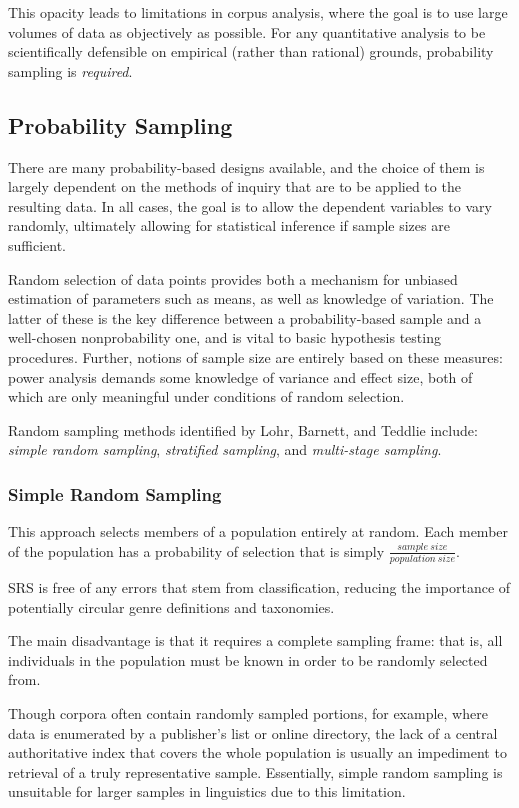 This opacity leads to limitations in corpus analysis, where the goal is to use large volumes of data as objectively as possible.  For any quantitative analysis to be scientifically defensible on empirical (rather than rational) grounds, probability sampling is \textsl{required}.




\subsection{Probability Sampling}
There are many probability-based designs available, and the choice of them is largely dependent on the methods of inquiry that are to be applied to the resulting data.  In all cases, the goal is to allow the dependent variables to vary randomly, ultimately allowing for statistical inference if sample sizes are sufficient.

Random selection of data points provides both a mechanism for unbiased estimation of parameters such as means, as well as knowledge of variation.  The latter of these is the key difference between a probability-based sample and a well-chosen nonprobability one, and is vital to basic hypothesis testing procedures.  Further, notions of sample size are entirely based on these measures: power analysis demands some knowledge of variance and effect size, both of which are only meaningful under conditions of random selection.

Random sampling methods identified by Lohr, Barnett, and Teddlie include\cite{lohr2009sampling,barnett1991sample,Teddlie01012007}: \textsl{simple random sampling}, \textsl{stratified sampling}, and \textsl{multi-stage sampling}.

\subsubsection{Simple Random Sampling}
This approach selects members of a population entirely at random.  Each member of the population has a probability of selection that is simply $\frac{sample~size}{population~size}$.

SRS is free of any errors that stem from classification, reducing the importance of potentially circular genre definitions and taxonomies.

The main disadvantage is that it requires a complete sampling frame: that is, all individuals in the population must be known in order to be randomly selected from.

Though corpora often contain randomly sampled portions, for example, where data is enumerated by a publisher's list or online directory, the lack of a central authoritative index that covers the whole population is usually an impediment to retrieval of a truly representative sample.  Essentially, simple random sampling is unsuitable for larger samples in linguistics due to this limitation.

